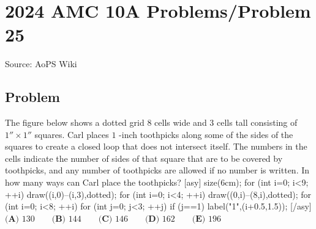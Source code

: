 \documentclass[12pt]{article}
\begin{document}
\section*{{2024 AMC 10A Problems/Problem 25}}
Source: AoPS Wiki

\subsection*{Problem}
The figure below shows a dotted grid $8$ cells wide and $3$ cells tall consisting of $1''\times1''$ squares. Carl places $1$ -inch toothpicks along some of the sides of the squares to create a closed loop that does not intersect itself. The numbers in the cells indicate the number of sides of that square that are to be covered by toothpicks, and any number of toothpicks are allowed if no number is written. In how many ways can Carl place the toothpicks? [asy] size(6cm); for (int i=0; i<9; ++i) { draw((i,0)--(i,3),dotted); } for (int i=0; i<4; ++i){ draw((0,i)--(8,i),dotted); } for (int i=0; i<8; ++i) { for (int j=0; j<3; ++j) { if (j==1) { label("1",(i+0.5,1.5)); }}} [/asy] $\textbf{(A) }130\qquad\textbf{(B) }144\qquad\textbf{(C) }146\qquad\textbf{(D) }162\qquad\textbf{(E) }196$
\end{document}
